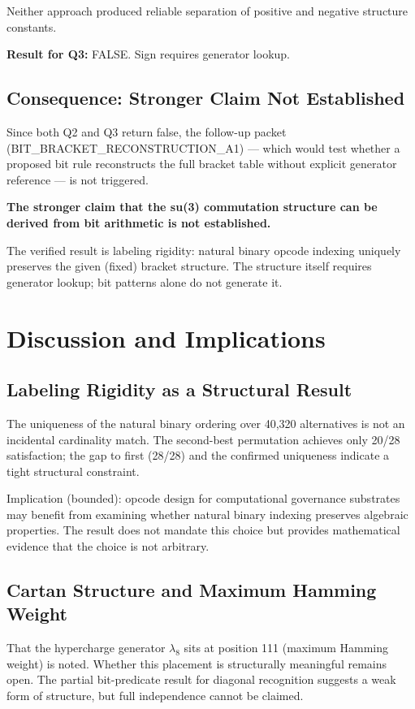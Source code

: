 \documentclass[11pt,a4paper]{article}
\begin{document}
Neither approach produced reliable separation of positive and negative structure constants.

\textbf{Result for Q3:} FALSE. Sign requires generator lookup.

\subsection{Consequence: Stronger Claim Not Established}

Since both Q2 and Q3 return false, the follow-up packet (BIT\_BRACKET\_RECONSTRUCTION\_A1) --- which would test whether a proposed bit rule reconstructs the full bracket table without explicit generator reference --- is not triggered.

\textbf{The stronger claim that the su(3) commutation structure can be derived from bit arithmetic is not established.}

The verified result is labeling rigidity: natural binary opcode indexing uniquely preserves the given (fixed) bracket structure. The structure itself requires generator lookup; bit patterns alone do not generate it.

\section{Discussion and Implications}

\subsection{Labeling Rigidity as a Structural Result}

The uniqueness of the natural binary ordering over 40,320 alternatives is not an incidental cardinality match. The second-best permutation achieves only 20/28 satisfaction; the gap to first (28/28) and the confirmed uniqueness indicate a tight structural constraint.

Implication (bounded): opcode design for computational governance substrates may benefit from examining whether natural binary indexing preserves algebraic properties. The result does not mandate this choice but provides mathematical evidence that the choice is not arbitrary.

\subsection{Cartan Structure and Maximum Hamming Weight}

That the hypercharge generator $\lambda_8$ sits at position 111 (maximum Hamming weight) is noted. Whether this placement is structurally meaningful remains open. The partial bit-predicate result for diagonal recognition suggests a weak form of structure, but full independence cannot be claimed.
\end{document}
